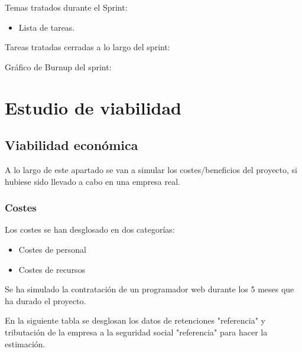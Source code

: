 Temas tratados durante el Sprint:
\begin{itemize}
	\item
	Lista de tareas.
\end{itemize}

Tareas tratadas cerradas a lo largo del sprint:

Gráfico de Burnup del sprint:

\section{Estudio de viabilidad}

\subsection{Viabilidad económica}

A lo largo de este apartado se van a simular los costes/beneficios del proyecto, si hubiese sido llevado a cabo en una empresa real.

\subsubsection{Costes}
Los costes se han desglosado en dos categorías:
\begin{itemize}
	\item	Costes de personal
	\item	Costes de recursos
\end{itemize}

Se ha simulado la contratación de un programador web durante los 5 meses que ha durado el proyecto.

En la siguiente tabla se desglosan los datos de retenciones "referencia" y tributación de la empresa a la seguridad social "referencia" para hacer la estimación.



